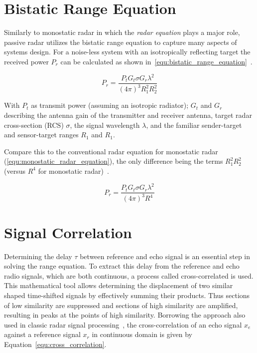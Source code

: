 \section{Bistatic Range Equation}

Similarly to monostatic radar in which the \emph{radar equation} plays a major role, passive radar utilizes the bistatic range equation to capture many aspects of systems design. For a noise-less system with an isotropically reflecting target the received power \(P_{r}\) can be calculated as shown in~\ref{equ:bistatic_range_equation}~\cite[p.~20]{Malanowski2019}.

\begin{equation}\label{equ:bistatic_range_equation}
    P_{r} = \frac{P_{t} G_{t} \sigma G_{r} \lambda^2}{{\left(4 \pi \right)}^3 R_{1}^2 R_{2}^2}
\end{equation}

With \(P_{t}\) as transmit power (assuming an isotropic radiator); \(G_{t}\) and \(G_{r}\) describing the antenna gain of the transmitter and receiver antenna, target radar cross-section (RCS) \(\sigma\), the signal wavelength \(\lambda\), and the familiar sender-target and sensor-target ranges \(R_{1}\) and \(R_{1}\).

Compare this to the conventional radar equation for monostatic radar (\ref{equ:monostatic_radar_equation}), the only difference being the terms \(R_{1}^2 R_{2}^2\) (versus \(R^4\) for monostatic radar)~\cite[p.~4]{Kloeck2019}.

\begin{equation}\label{equ:monostatic_radar_equation}
    P_{r} = \frac{P_{t} G_{t} \sigma G_{r} \lambda^2}{{\left(4 \pi \right)}^3 R^4}
\end{equation}

\section{Signal Correlation}

Determining the delay \(\tau\) between reference and echo signal is an essential step in solving the range equation. To extract this delay from the reference and echo radio signals, which are both continuous, a process called cross-correlated is used. This mathematical tool allows determining the displacement of two similar shaped time-shifted signals by effectively summing their products. Thus sections of low similarity are suppressed and sections of high similarity are amplified, resulting in peaks at the points of high similarity. Borrowing the approach also used in classic radar signal processing~\cite{Richards2014}, the cross-correlation of an echo signal \(x_e\) against a reference signal \(x_r\) in continuous domain is given by Equation~\ref{equ:cross_correlation}.

